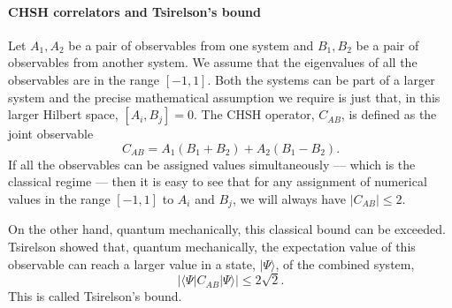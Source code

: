 \documentclass[12pt]{article}
\newcommand{\be}{\begin{equation}}
\newcommand{\ee}{\end{equation}}
\begin{document}
\paragraph{\bf CHSH correlators and Tsirelson's bound \\}
 
Let $A_1, A_2$ be a pair of observables from one system  and  $B_1, B_2$ be a pair of observables from another system.    We assume that the eigenvalues of all the observables are in the range $[-1, 1]$. Both the systems can be part of a larger system and the precise mathematical assumption we require is just that, in this larger Hilbert space, $[A_i, B_j] = 0$. The CHSH operator, $C_{AB}$, is
defined as the joint observable
\be
\label{cabdefn}
C_{AB} =  A_1 (B_1 + B_2)  +  A_2 (B_1 - B_2).
\ee
If all the observables can be assigned values simultaneously --- which is the classical regime --- then it is easy to see that for any assignment of numerical values in the range $[-1,1]$ to $A_i$ and $B_j$, we will always have $|C_{AB}| \leq 2$.


On the other hand, quantum mechanically, this classical bound can be exceeded. Tsirelson \cite{cirel1980quantum} showed that, quantum mechanically, the expectation value of this observable can reach a larger value  in a state, $|\Psi \rangle$, of the combined system,
\be
|\langle \Psi |  C_{AB}  | \Psi \rangle| \leq 2 \sqrt{2}.
\ee
This is called Tsirelson's bound.
\end{document}
